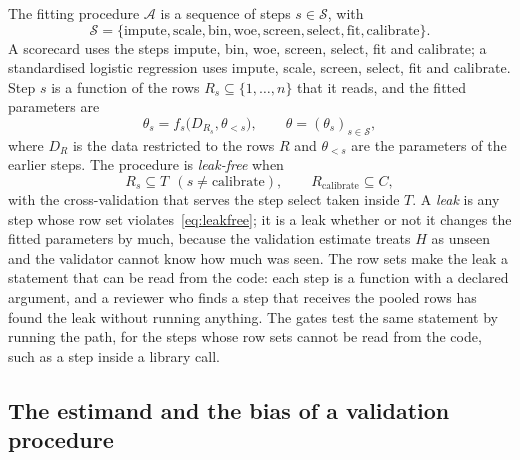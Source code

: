 The fitting procedure $\mathcal A$ is a sequence of steps $s\in\mathcal S$, with
\begin{equation}
\mathcal S=\{\text{impute},\text{scale},\text{bin},\text{woe},\text{screen},\text{select},\text{fit},\text{calibrate}\}.
\label{eq:steps}
\end{equation}
A scorecard uses the steps impute, bin, woe, screen, select, fit and calibrate; a standardised logistic regression uses impute, scale, screen, select, fit and calibrate. Step $s$ is a function of the rows $R_s\subseteq\{1,\dots,n\}$ that it reads, and the fitted parameters are
\begin{equation}
\theta_s=f_s\bigl(D_{R_s},\theta_{<s}\bigr),\qquad \theta=(\theta_s)_{s\in\mathcal S},
\label{eq:fit}
\end{equation}
where $D_R$ is the data restricted to the rows $R$ and $\theta_{<s}$ are the parameters of the earlier steps. The procedure is \emph{leak-free} when
\begin{equation}
R_s\subseteq T\ \ (s\neq\text{calibrate}),\qquad R_{\text{calibrate}}\subseteq C,
\label{eq:leakfree}
\end{equation}
with the cross-validation that serves the step select taken inside $T$. A \emph{leak} is any step whose row set violates~\eqref{eq:leakfree}; it is a leak whether or not it changes the fitted parameters by much, because the validation estimate treats $H$ as unseen and the validator cannot know how much was seen. The row sets make the leak a statement that can be read from the code: each step is a function with a declared argument, and a reviewer who finds a step that receives the pooled rows has found the leak without running anything. The gates test the same statement by running the path, for the steps whose row sets cannot be read from the code, such as a step inside a library call.

\subsection{The estimand and the bias of a validation procedure}

